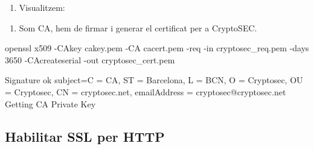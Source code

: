 \documentclass[]{article}
\newenvironment{Shaded}{}{}
\newcommand{\ExtensionTok}[1]{#1}
\newcommand{\NormalTok}[1]{#1}
\newcommand{\VariableTok}[1]{\textcolor[rgb]{0.10,0.09,0.49}{#1}}
\providecommand{\tightlist}{%
  \setlength{\itemsep}{0pt}\setlength{\parskip}{0pt}}
\begin{document}
\begin{enumerate}
\def\labelenumi{\arabic{enumi}.}
\setcounter{enumi}{3}
\tightlist
\item
  Visualitzem:
\end{enumerate}

\begin{Shaded}
\end{Shaded}

\begin{enumerate}
\def\labelenumi{\arabic{enumi}.}
\setcounter{enumi}{4}
\tightlist
\item
  Som CA, hem de firmar i generar el certificat per a CryptoSEC.
\end{enumerate}

\begin{Shaded}
\begin{Highlighting}[]
\ExtensionTok{openssl}\NormalTok{ x509 -CAkey cakey.pem -CA cacert.pem -req -in cryptosec_req.pem}
 \ExtensionTok{-days}\NormalTok{ 3650 -CAcreateserial -out cryptosec_cert.pem}
\end{Highlighting}
\end{Shaded}

\begin{Shaded}
\begin{Highlighting}[]
\ExtensionTok{Signature}\NormalTok{ ok}
\VariableTok{subject=}\NormalTok{C = }\ExtensionTok{CA}\NormalTok{, ST = Barcelona, L = BCN, O = Cryptosec, OU = Cryptosec, CN = cryptosec.net, emailAddress = cryptosec@cryptosec.net}
\ExtensionTok{Getting}\NormalTok{ CA Private Key}
\end{Highlighting}
\end{Shaded}

\hypertarget{habilitar-ssl-per-http}{%
\subsection{\texorpdfstring{\textbf{Habilitar SSL per
HTTP}}{Habilitar SSL per HTTP}}\label{habilitar-ssl-per-http}}
\end{document}
